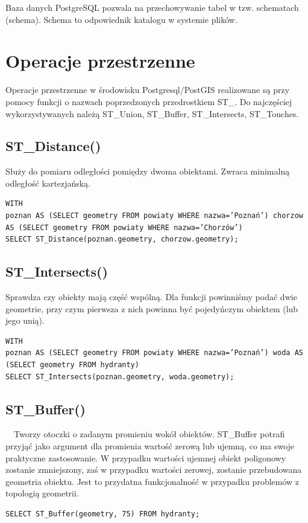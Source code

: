 \documentclass[12pt,a4paper]{book}
\begin{document}
Baza danych PostgreSQL pozwala na przechowywanie tabel w tzw. schematach (schema). Schema to odpowiednik katalogu w systemie plików.

\section{Operacje przestrzenne}
Operacje przestrzenne w środowisku Postgresql/PostGIS realizowane są przy pomocy funkcji o nazwach poprzedzonych przedrostkiem ST\_. Do najczęściej wykorzystywanych należą ST\_Union, ST\_Buffer, ST\_Intersects, ST\_Touches.

\subsection{ST\_Distance()}
Służy do pomiaru odległości pomiędzy dwoma obiektami. Zwraca minimalną odległość kartezjańską.

\begin{verbatim}
WITH
poznan AS (SELECT geometry FROM powiaty WHERE nazwa=’Poznań’) chorzow AS (SELECT geometry FROM powiaty WHERE nazwa=’Chorzów’)
SELECT ST_Distance(poznan.geometry, chorzow.geometry);
\end{verbatim}
\subsection{ST\_Intersects()}
Sprawdza czy obiekty mają część wspólną. Dla funkcji powinniśmy podać dwie geometrie, przy czym pierwsza z nich powinna być pojedyńczym obiektem (lub jego unią).

\begin{verbatim}
WITH
poznan AS (SELECT geometry FROM powiaty WHERE nazwa=’Poznań’) woda AS (SELECT geometry FROM hydranty)
SELECT ST_Intersects(poznan.geometry, woda.geometry);
\end{verbatim}
\subsection{ST\_Buffer()}
\ \ Tworzy otoczki o zadanym promieniu wokół obiektów. ST\_Buffer potrafi przyjąć jako argument dla promienia wartość zerową lub ujemną, co ma swoje praktyczne zastosowanie. W przypadku wartości ujemnej obiekt poligonowy zostanie zmniejszony, zaś w przypadku wartości zerowej, zostanie przebudowana geometria obiektu. Jest to przydatna funkcjonalność w przypadku problemów z topologią geometrii.

\begin{verbatim}
SELECT ST_Buffer(geometry, 75) FROM hydranty;
\end{verbatim}
\end{document}
